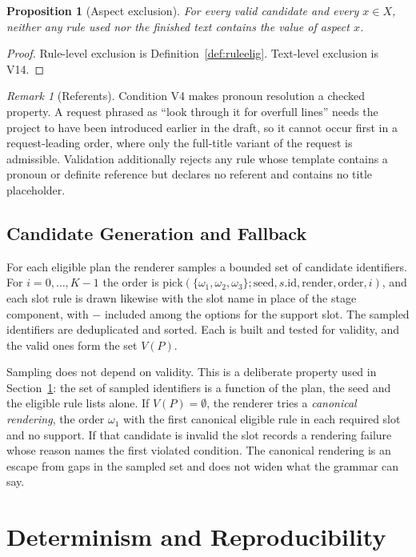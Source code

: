 \documentclass[11pt]{article}
\newtheorem{proposition}[theorem]{Proposition}
\theoremstyle{definition}
\theoremstyle{remark}
\newtheorem{remark}[theorem]{Remark}
\begin{document}
\begin{proposition}[Aspect exclusion]\label{prop:aspect}
For every valid candidate and every $x\in X$, neither any rule used nor the finished text contains the value of aspect $x$.
\end{proposition}
\begin{proof}
Rule-level exclusion is Definition~\ref{def:ruleelig}. Text-level exclusion is V14.
\end{proof}

\begin{remark}[Referents]
Condition V4 makes pronoun resolution a checked property. A request phrased as ``look through it for overfull lines'' needs the project to have been introduced earlier in the draft, so it cannot occur first in a request-leading order, where only the full-title variant of the request is admissible. Validation additionally rejects any rule whose template contains a pronoun or definite reference but declares no referent and contains no title placeholder.
\end{remark}

\subsection{Candidate Generation and Fallback}

For each eligible plan the renderer samples a bounded set of candidate identifiers. For $i=0,\dots,K-1$ the order is $\mathrm{pick}(\{\omega_1,\omega_2,\omega_3\};\mathrm{seed},s.\mathrm{id},\text{render},\text{order},i)$, and each slot rule is drawn likewise with the slot name in place of the stage component, with $-$ included among the options for the support slot. The sampled identifiers are deduplicated and sorted. Each is built and tested for validity, and the valid ones form the set $V(P)$.

Sampling does not depend on validity. This is a deliberate property used in Section~\ref{sec:det}: the set of sampled identifiers is a function of the plan, the seed and the eligible rule lists alone. If $V(P)=\emptyset$, the renderer tries a \emph{canonical rendering}, the order $\omega_1$ with the first canonical eligible rule in each required slot and no support. If that candidate is invalid the slot records a rendering failure whose reason names the first violated condition. The canonical rendering is an escape from gaps in the sampled set and does not widen what the grammar can say.

\section{Determinism and Reproducibility}\label{sec:det}
\end{document}
